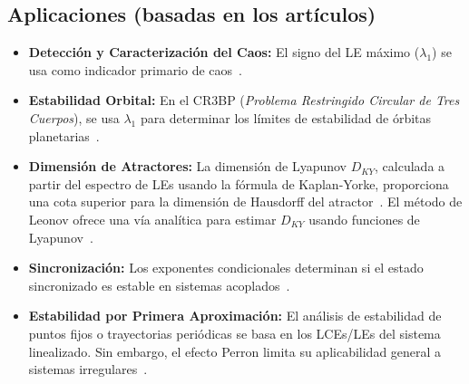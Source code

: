 \subsection{Aplicaciones (basadas en los artículos)}
\begin{itemize}
    \item \textbf{Detección y Caracterización del Caos:} El signo del LE máximo ($\lambda_1$) se usa como indicador primario de caos~\cite{Quarles2011}.
    \item \textbf{Estabilidad Orbital:} En el CR3BP (\textit{Problema Restringido Circular de Tres Cuerpos}), se usa $\lambda_1$ para determinar los límites de estabilidad de órbitas planetarias~\cite{Quarles2011}.
    \item \textbf{Dimensión de Atractores:} La dimensión de Lyapunov $D_{KY}$, calculada a partir del espectro de LEs usando la fórmula de Kaplan-Yorke, proporciona una cota superior para la dimensión de Hausdorff del atractor~\cite{Kuznetsov2016, Kuznetsov_2016}. El método de Leonov ofrece una vía analítica para estimar $D_{KY}$ usando funciones de Lyapunov~\cite{Kuznetsov_2016}.
    \item \textbf{Sincronización:} Los exponentes condicionales determinan si el estado sincronizado es estable en sistemas acoplados~\cite{Pecora1997}.
    \item \textbf{Estabilidad por Primera Aproximación:} El análisis de estabilidad de puntos fijos o trayectorias periódicas se basa en los LCEs/LEs del sistema linealizado. Sin embargo, el efecto Perron limita su aplicabilidad general a sistemas irregulares~\cite{Leonov2007, Kuznetsov2005}.
\end{itemize}

